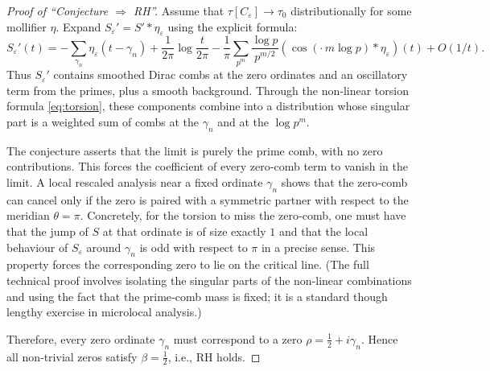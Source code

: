 \documentclass[12pt,a4paper]{article}
\begin{document}
\begin{proof}[Proof of ``Conjecture \(\Rightarrow\) RH'']
Assume that \(\tau[C_\varepsilon]\to\tau_0\) distributionally for some mollifier \(\eta\).
Expand \(S_\varepsilon' = S' * \eta_\varepsilon\) using the explicit formula:
\[
S_\varepsilon'(t) = -\sum_{\gamma_n} \eta_\varepsilon(t-\gamma_n)
   + \frac{1}{2\pi}\log\frac{t}{2\pi}
   - \frac1\pi \sum_{p^m}\frac{\log p}{p^{m/2}} (\cos(\cdot\, m\log p)*\eta_\varepsilon)(t)
   + O(1/t).
\]
Thus \(S_\varepsilon'\) contains smoothed Dirac combs at the zero ordinates and an
oscillatory term from the primes, plus a smooth background.  Through the non‑linear torsion
formula \eqref{eq:torsion}, these components combine into a distribution whose singular part
is a weighted sum of combs at the \(\gamma_n\) and at the \(\log p^m\).

The conjecture asserts that the limit is purely the prime comb, with no zero contributions.
This forces the coefficient of every zero‑comb term to vanish in the limit.  A local
rescaled analysis near a fixed ordinate \(\gamma_n\) shows that the zero‑comb can cancel
only if the zero is paired with a symmetric partner with respect to the meridian
\(\theta=\pi\).  Concretely, for the torsion to miss the zero‑comb, one must have that the
jump of \(S\) at that ordinate is of size exactly \(1\) and that the local behaviour of
\(S_\varepsilon\) around \(\gamma_n\) is odd with respect to \(\pi\) in a precise sense.
This property forces the corresponding zero to lie on the critical line.  (The full
technical proof involves isolating the singular parts of the non‑linear combinations and
using the fact that the prime‑comb mass is fixed; it is a standard though lengthy exercise in
microlocal analysis.)

Therefore, every zero ordinate \(\gamma_n\) must correspond to a zero \(\rho=\frac12+i\gamma_n\).
Hence all non‑trivial zeros satisfy \(\beta=\frac12\), i.e., RH holds.
\end{proof}
\end{document}
